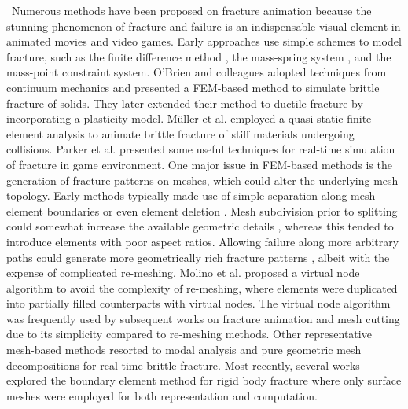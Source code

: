 ~Numerous methods have been proposed on fracture animation \cite{muguercia2014fracture,Wu:2015:SPB:2858852.2858866} because the stunning phenomenon of fracture and failure is an indispensable visual element in animated movies and video games. Early approaches use simple schemes to model fracture, such as the finite difference method \cite{Terzopoulos:1988:MID:378456.378522}, the mass-spring system \cite{Norton:1991:AFP:115244.115248}, and the mass-point constraint system\cite{smith2001fast}. O'Brien and colleagues \cite{O'Brien:1999:GMA:311535.311550} adopted techniques from continuum mechanics and presented a FEM-based method to simulate brittle fracture of solids. They later extended their method to ductile fracture by incorporating a plasticity model\cite{O'Brien:2002:GMA:566654.566579}. M\"{u}ller et al. \cite{Muller2001} employed a quasi-static finite element analysis to animate brittle fracture of stiff materials undergoing collisions. Parker et al. \cite{Parker:2009:RDF:1599470.1599492} presented some useful techniques for real-time simulation of fracture in game environment. One major issue in FEM-based methods is the generation of fracture patterns on meshes, which could alter the underlying mesh topology. Early methods typically made use of simple separation along mesh element boundaries \cite{Norton:1991:AFP:115244.115248,Mazarak:1999:AEO:351631.351688,smith2001fast,Muller2001} or even element deletion \cite{forest2002removing}. Mesh subdivision prior to splitting could somewhat increase the available geometric details \cite{Mor:2000:MST:646923.710372,Bielser:2000:ISS:826029.826523}, whereas this tended to introduce elements with poor aspect ratios. Allowing failure along more arbitrary paths could generate more geometrically rich fracture patterns \cite{Neff:1999:VMB:351631.351686,O'Brien:1999:GMA:311535.311550,O'Brien:2002:GMA:566654.566579}, albeit with the expense of complicated re-meshing. Molino et al. \cite{Molino2004} proposed a virtual node algorithm to avoid the complexity of re-meshing, where elements were duplicated into partially filled counterparts with virtual nodes. The virtual node algorithm was frequently used by subsequent works on fracture animation \cite{Bao:2007:FRM:1263129.1263275} and mesh cutting \cite{Sifakis:2007:ACD:1272690.1272701,Wang:2015:AVN:2849517.2849531} due to its simplicity compared to re-meshing methods. Other representative mesh-based methods resorted to modal analysis \cite{glondu2013real} and pure geometric mesh decompositions \cite{Muller:2013:RTD:2461912.2461934,Schvartzman:2014:FAB:2556700.2556713} for real-time brittle fracture. Most recently, several works explored the boundary element method for rigid body fracture \cite{Zhu:2015:SRB:2809654.2766942,Hahn:2015:HBF:2809654.2766896} where only surface meshes were employed for both representation and computation.

